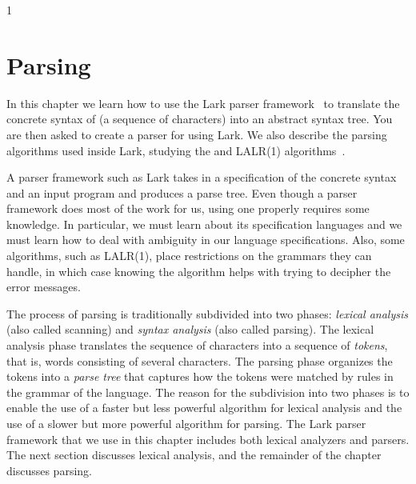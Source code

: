\documentclass[7x10]{TimesAPriori_MIT}%
\def\pythonEd{1}
\def\edition{1}
\newcommand{\pythonColor}[0]{}
\numberwithin{theorem}{chapter}
\numberwithin{definition}{chapter}
\numberwithin{equation}{chapter}
\begin{document}
{\if\edition\pythonEd\pythonColor
\chapter{Parsing}
\label{ch:parsing}
\setcounter{footnote}{0}

In this chapter we learn how to use the Lark parser
framework~\citep{shinan20:_lark_docs} to translate the concrete syntax
of \LangInt{} (a sequence of characters) into an abstract syntax tree.
You are then asked to create a parser for \LangVar{} using Lark.
We also describe the parsing algorithms used inside Lark, studying the
\citet{Earley:1970ly} and LALR(1) algorithms~\citep{DeRemer69,Anderson73}.

A parser framework such as Lark takes in a specification of the
concrete syntax and an input program and produces a parse tree. Even
though a parser framework does most of the work for us, using one
properly requires some knowledge.  In particular, we must learn about
its specification languages and we must learn how to deal with
ambiguity in our language specifications. Also, some algorithms, such
as LALR(1), place restrictions on the grammars they can handle, in
which case knowing the algorithm helps with trying to decipher the
error messages.

The process of parsing is traditionally subdivided into two phases:
\emph{lexical analysis} (also called scanning) and \emph{syntax
  analysis} (also called parsing). The lexical analysis phase
translates the sequence of characters into a sequence of
\emph{tokens}, that is, words consisting of several characters. The
parsing phase organizes the tokens into a \emph{parse tree} that
captures how the tokens were matched by rules in the grammar of the
language. The reason for the subdivision into two phases is to enable
the use of a faster but less powerful algorithm for lexical analysis
and the use of a slower but more powerful algorithm for parsing.
%
%
The Lark parser framework that we use in this chapter includes both
lexical analyzers and parsers. The next section discusses lexical
analysis, and the remainder of the chapter discusses parsing.


}
\end{document}
